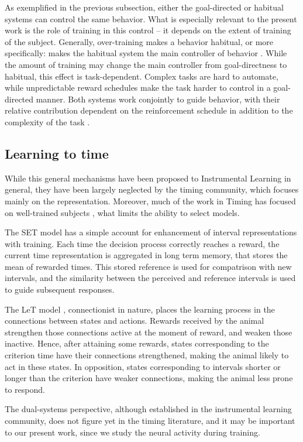         As exemplified in the previous subsection, either the goal-directed or habitual systems can control the same behavior. What is especially relevant to the present work is the role of training in this control -- it depends on the extent of training of the subject. Generally, over-training makes a behavior habitual, or more specifically: makes the habitual system the main controller of behavior \cite{dolan2013goals}. While the amount of training may change the main controller from goal-directness to habitual, this effect is task-dependent. Complex tasks are hard to automate, while unpredictable reward schedules make the task harder to control in a goal-directed manner. Both systems work conjointly to guide behavior, with their relative contribution dependent on the reinforcement schedule in addition to the complexity of the task \cite{dickinson2015instrumental}.
        
    \subsection{Learning to time}
        While this general mechanisms have been proposed to Instrumental Learning in general, they have been largely neglected by the timing community, which focuses mainly on the representation. Moreover, much of the work in Timing has focused on well-trained subjects \cite{bakhurin2017differential}, what limits the ability to select models. 
        
        The SET model \cite{gibbon1977scalar} has a simple account for enhancement of interval representations with training. Each time the decision process correctly reaches a reward, the current time representation is aggregated in long term memory, that stores the mean of rewarded times. This stored reference is used for compatrison with new intervals, and the similarity between the perceived and reference intervals is used to guide subsequent responses. 
        
        The LeT model \cite{machado2009learning}, connectionist in nature, places the learning process in the connections between states and actions. Rewards received by the animal strengthen those connections active at the moment of reward, and weaken those inactive. Hence, after attaining some rewards, states corresponding to the criterion time have their connections strengthened, making the animal likely to act in these states. In opposition, states corresponding to intervals shorter or longer than the criterion have weaker connections, making the animal less prone to respond.
        
        The dual-systems perspective, although established in the instrumental learning community, does not figure yet in the timing literature, and it may be important to our present work, since we study the neural activity during training. 
    